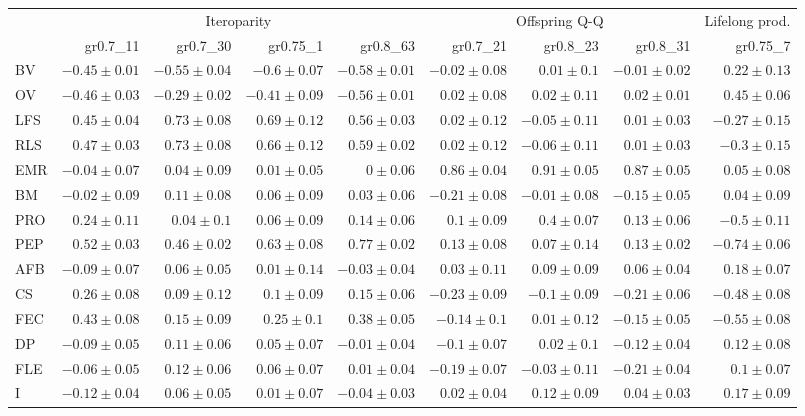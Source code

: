\begin{landscape}
\begin{table}
\begin{footnotesize}
\begin{tabular}{@{}l|rrrr|rrr|r@{}}
\toprule
 & \multicolumn{4}{c|}{Iteroparity} & \multicolumn{3}{c|}{Offspring Q-Q} & \multicolumn{1}{c}{Lifelong prod.}\\
 & gr0.7\_11 & gr0.7\_30 & gr0.75\_1 & gr0.8\_63 & gr0.7\_21 & gr0.8\_23 & gr0.8\_31 & gr0.75\_7\\
\midrule
BV & $-0.45 \pm 0.01$ & $-0.55 \pm 0.04$ & $-0.6 \pm 0.07$ & $-0.58 \pm 0.01$ & $-0.02 \pm 0.08$ & $0.01 \pm 0.1$ & $-0.01 \pm 0.02$ & $0.22 \pm 0.13$\\
OV & $-0.46 \pm 0.03$ & $-0.29 \pm 0.02$ & $-0.41 \pm 0.09$ & $-0.56 \pm 0.01$ & $0.02 \pm 0.08$ & $0.02 \pm 0.11$ & $0.02 \pm 0.01$ & $0.45 \pm 0.06$\\
LFS & $0.45 \pm 0.04$ & $0.73 \pm 0.08$ & $0.69 \pm 0.12$ & $0.56 \pm 0.03$ & $0.02 \pm 0.12$ & $-0.05 \pm 0.11$ & $0.01 \pm 0.03$ & $-0.27 \pm 0.15$\\
RLS & $0.47 \pm 0.03$ & $0.73 \pm 0.08$ & $0.66 \pm 0.12$ & $0.59 \pm 0.02$ & $0.02 \pm 0.12$ & $-0.06 \pm 0.11$ & $0.01 \pm 0.03$ & $-0.3 \pm 0.15$\\
EMR & $-0.04 \pm 0.07$ & $0.04 \pm 0.09$ & $0.01 \pm 0.05$ & $0 \pm 0.06$ & $0.86 \pm 0.04$ & $0.91 \pm 0.05$ & $0.87 \pm 0.05$ & $0.05 \pm 0.08$\\
BM & $-0.02 \pm 0.09$ & $0.11 \pm 0.08$ & $0.06 \pm 0.09$ & $0.03 \pm 0.06$ & $-0.21 \pm 0.08$ & $-0.01 \pm 0.08$ & $-0.15 \pm 0.05$ & $0.04 \pm 0.09$\\
PRO & $0.24 \pm 0.11$ & $0.04 \pm 0.1$ & $0.06 \pm 0.09$ & $0.14 \pm 0.06$ & $0.1 \pm 0.09$ & $0.4 \pm 0.07$ & $0.13 \pm 0.06$ & $-0.5 \pm 0.11$\\
PEP & $0.52 \pm 0.03$ & $0.46 \pm 0.02$ & $0.63 \pm 0.08$ & $0.77 \pm 0.02$ & $0.13 \pm 0.08$ & $0.07 \pm 0.14$ & $0.13 \pm 0.02$ & $-0.74 \pm 0.06$\\
AFB & $-0.09 \pm 0.07$ & $0.06 \pm 0.05$ & $0.01 \pm 0.14$ & $-0.03 \pm 0.04$ & $0.03 \pm 0.11$ & $0.09 \pm 0.09$ & $0.06 \pm 0.04$ & $0.18 \pm 0.07$\\
CS & $0.26 \pm 0.08$ & $0.09 \pm 0.12$ & $0.1 \pm 0.09$ & $0.15 \pm 0.06$ & $-0.23 \pm 0.09$ & $-0.1 \pm 0.09$ & $-0.21 \pm 0.06$ & $-0.48 \pm 0.08$\\
FEC & $0.43 \pm 0.08$ & $0.15 \pm 0.09$ & $0.25 \pm 0.1$ & $0.38 \pm 0.05$ & $-0.14 \pm 0.1$ & $0.01 \pm 0.12$ & $-0.15 \pm 0.05$ & $-0.55 \pm 0.08$\\
DP & $-0.09 \pm 0.05$ & $0.11 \pm 0.06$ & $0.05 \pm 0.07$ & $-0.01 \pm 0.04$ & $-0.1 \pm 0.07$ & $0.02 \pm 0.1$ & $-0.12 \pm 0.04$ & $0.12 \pm 0.08$\\
FLE & $-0.06 \pm 0.05$ & $0.12 \pm 0.06$ & $0.06 \pm 0.07$ & $0.01 \pm 0.04$ & $-0.19 \pm 0.07$ & $-0.03 \pm 0.11$ & $-0.21 \pm 0.04$ & $0.1 \pm 0.07$\\
I & $-0.12 \pm 0.04$ & $0.06 \pm 0.05$ & $0.01 \pm 0.07$ & $-0.04 \pm 0.03$ & $0.02 \pm 0.04$ & $0.12 \pm 0.09$ & $0.04 \pm 0.03$ & $0.17 \pm 0.09$\\
\bottomrule
\end{tabular}


\end{footnotesize}
\end{table}
\end{landscape}
